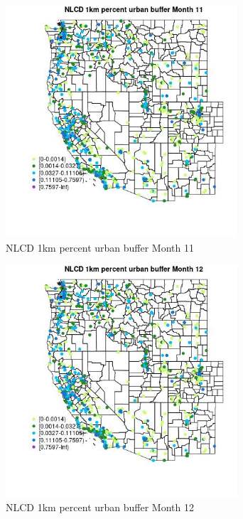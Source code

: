 \begin{figure} 
\centering  
\includegraphics[width=0.77\textwidth]{Code_Outputs/Report_ML_input_PM25_Step4_part_e_de_duplicated_aves_compiled_2019-05-21wNAs_MapObsMo11NLCD_1km_percent_urban_buffer.jpg} 
\caption{\label{fig:Report_ML_input_PM25_Step4_part_e_de_duplicated_aves_compiled_2019-05-21wNAsMapObsMo11NLCD_1km_percent_urban_buffer}NLCD 1km percent urban buffer Month 11} 
\end{figure} 
 

\begin{figure} 
\centering  
\includegraphics[width=0.77\textwidth]{Code_Outputs/Report_ML_input_PM25_Step4_part_e_de_duplicated_aves_compiled_2019-05-21wNAs_MapObsMo12NLCD_1km_percent_urban_buffer.jpg} 
\caption{\label{fig:Report_ML_input_PM25_Step4_part_e_de_duplicated_aves_compiled_2019-05-21wNAsMapObsMo12NLCD_1km_percent_urban_buffer}NLCD 1km percent urban buffer Month 12} 
\end{figure} 
 

